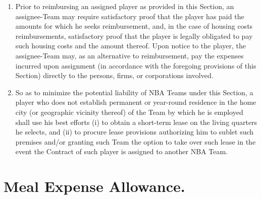 \documentclass[
]{book}
\begin{document}
\begin{enumerate}
\item
  Prior to reimbursing an assigned player as provided in this Section, an assignee-Team may require satisfactory proof that the player has paid the amounts for which he seeks reimbursement, and, in the case of housing costs reimbursements, satisfactory proof that the player is legally obligated to pay such housing costs and the amount thereof. Upon notice to the player, the assignee-Team may, as an alternative to reimbursement, pay the expenses incurred upon assignment (in accordance with the foregoing provisions of this Section) directly to the persons, firms, or corporations involved.
\item
  So as to minimize the potential liability of NBA Teams under this Section, a player who does not establish permanent or year-round residence in the home city (or geographic vicinity thereof) of the Team by which he is employed shall use his best efforts (i) to obtain a short-term lease on the living quarters he selects, and (ii) to procure lease provisions authorizing him to sublet such premises and/or granting such Team the option to take over such lease in the event the Contract of such player is assigned to another NBA Team.
\end{enumerate}

\hypertarget{meal-expense-allowance.}{%
\section{Meal Expense Allowance.}\label{meal-expense-allowance.}}
\end{document}
